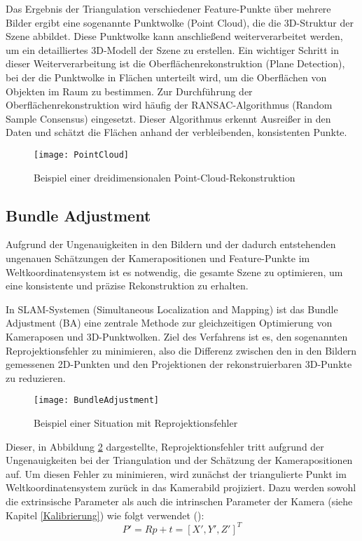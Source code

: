 Das Ergebnis der Triangulation verschiedener Feature-Punkte über mehrere Bilder ergibt eine sogenannte Punktwolke (Point Cloud), die die 3D-Struktur der Szene abbildet. Diese Punktwolke kann anschließend weiterverarbeitet werden, um ein detailliertes 3D-Modell der Szene zu erstellen. Ein wichtiger Schritt in dieser Weiterverarbeitung ist die Oberflächenrekonstruktion (Plane Detection), bei der die Punktwolke in Flächen unterteilt wird, um die Oberflächen von Objekten im Raum zu bestimmen. Zur Durchführung der Oberflächenrekonstruktion wird häufig der RANSAC-Algorithmus (Random Sample Consensus) eingesetzt. Dieser Algorithmus erkennt Ausreißer in den Daten und schätzt die Flächen anhand der verbleibenden, konsistenten Punkte.

\begin{figure}
    \centering
    \texttt{[image: PointCloud]}
    \caption{Beispiel einer dreidimensionalen Point-Cloud-Rekonstruktion\label{fig:PointCloud}}\par
\end{figure}

\subsection{Bundle Adjustment}

Aufgrund der Ungenauigkeiten in den Bildern und der dadurch entstehenden ungenauen Schätzungen der Kamerapositionen und Feature-Punkte im Weltkoordinatensystem ist es notwendig, die gesamte Szene zu optimieren, um eine konsistente und präzise Rekonstruktion zu erhalten. 

In SLAM-Systemen (Simultaneous Localization and Mapping) ist das Bundle Adjustment (BA) eine zentrale Methode zur gleichzeitigen Optimierung von Kameraposen und 3D-Punktwolken. Ziel des Verfahrens ist es, den sogenannten Reprojektionsfehler zu minimieren, also die Differenz zwischen den in den Bildern gemessenen 2D-Punkten und den Projektionen der rekonstruierbaren 3D-Punkte zu reduzieren. \cite{gao2021vSLAM}

\begin{figure}
    \centering
    \texttt{[image: BundleAdjustment]}
    \caption{Beispiel einer Situation mit Reprojektionsfehler\label{fig:BA}}\par
\end{figure}

Dieser, in Abbildung \ref{fig:BA} dargestellte, Reprojektionsfehler tritt aufgrund der Ungenauigkeiten bei der Triangulation und der Schätzung der Kamerapositionen auf. Um diesen Fehler zu minimieren, wird zunächst der triangulierte Punkt im Weltkoordinatensystem zurück in das Kamerabild projiziert. Dazu werden sowohl die extrinsische Parameter als auch die intrinschen Parameter der Kamera (siehe Kapitel \ref{Kalibrierung}) wie folgt verwendet (\cite{gao2021vSLAM}): 
\begin{equation}
    P' = Rp+t = [X', Y', Z']^T
\end{equation}

